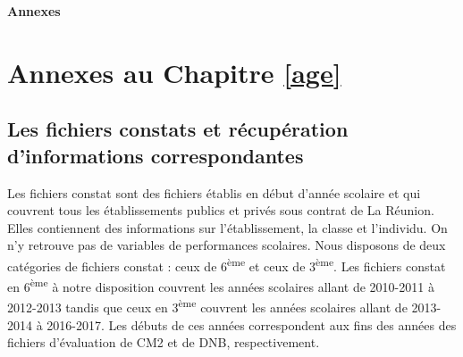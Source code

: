 \documentclass[
]{book}
\begin{document}
\newcommand{\smark}{\sectionmark}
\renewcommand\smark[1]{\markboth{#1}{}}
\markboth{}{}

\centering \LARGE

\pagebreak
\hspace{0pt}
\vfill

\textbf{Annexes}
\vfill
\hspace{0pt}
\pagebreak

\raggedright \normalsize

\hypertarget{annexes-au-chapitre-refage}{%
\chapter*{Annexes au Chapitre \ref{age}}\label{annexes-au-chapitre-refage}}

\renewcommand*{\theHchapter}{\thechapter}
\renewcommand*{\thesection}{\Alph{section}}
\renewcommand*{\theHsection}{Appendix.\thechapter\thesection}

\renewcommand*{\thetable}{\Alph{section}.\arabic{table}}
\renewcommand*{\theHtable}{Appendix.\thetable}

\renewcommand*{\thefigure}{\Alph{section}.\arabic{figure}}
\renewcommand*{\theHfigure}{Appendix.\thefigure}

\setcounter{section}{0}

\setcounter{table}{0}
\setcounter{figure}{0}

\hypertarget{ageconstats}{%
\section{Les fichiers constats et récupération d'informations correspondantes}\label{ageconstats}}

Les fichiers constat sont des fichiers établis en début d'année scolaire et qui couvrent tous les établissements publics et privés sous contrat de La Réunion. Elles contiennent des informations sur l'établissement, la classe et l'individu. On n'y retrouve pas de variables de performances scolaires.
Nous disposons de deux catégories de fichiers constat : ceux de 6\textsuperscript{ème} et ceux de 3\textsuperscript{ème}. Les fichiers constat en 6\textsuperscript{ème} à notre disposition couvrent les années scolaires allant de 2010-2011 à 2012-2013 tandis que ceux en 3\textsuperscript{ème} couvrent les années scolaires allant de 2013-2014 à 2016-2017. Les débuts de ces années correspondent aux fins des années des fichiers d'évaluation de CM2 et de DNB, respectivement.
\end{document}
